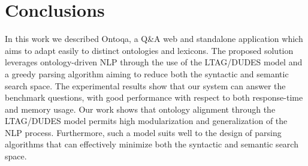 \section{Conclusions}
\label{sec:conclusions}

In this work we described Ontoqa, a Q\&A web and standalone application which aims to adapt easily to distinct ontologies and lexicons.
%
The proposed solution leverages ontology-driven NLP through the use of the LTAG/DUDES model and a greedy parsing algorithm aiming to reduce both the syntactic and semantic search space.
%
%
The experimental results show that our system can answer the benchmark questions, with good performance with respect to both response-time and memory usage. 
%
%
Our work shows that ontology alignment through the LTAG/DUDES model permits 
high modularization and generalization of the NLP process.
%
Furthermore, such a model suits well to the design of parsing algorithms that can effectively minimize both the syntactic and semantic search space.
